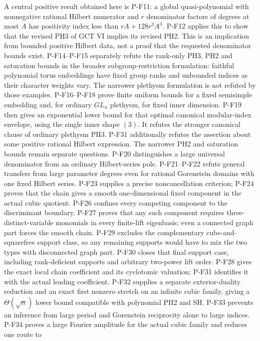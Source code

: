 \documentclass[11pt,a4paper]{article}
\begin{document}
A central positive result obtained here is P-F11: a global
quasi-polynomial with nonnegative rational Hilbert numerator and
$r$ denominator factors of degrees at most $A$ has positivity index
less than $rA+128r^3A^3$. P-F12 applies this to show that the revised
PH3 of GCT VI implies its revised PH2. This is an implication from
bounded positive Hilbert data, not a proof that the requested
denominator bounds exist.
P-F14--P-F15 separately refute the rank-only PH3, PH2 and saturation
bounds in the broader subgroup-restriction formulation: faithful
polynomial torus embeddings have fixed group ranks and unbounded
indices as their character weights vary. The narrower plethysm
formulation is not refuted by those examples.
P-F16--P-F18 prove finite uniform bounds for a fixed semisimple
embedding and, for ordinary $GL_n$ plethysm, for fixed inner dimension.
P-F19 then gives an exponential lower bound for that optimal canonical
modular-index envelope, using the single inner shape $(3)$.
It refutes the stronger canonical clause of ordinary plethysm PH3.
P-F31 additionally refutes the assertion about some positive rational
Hilbert expression. The narrower PH2 and saturation bounds remain
separate questions.
P-F20 distinguishes a large universal denominator from an ordinary
Hilbert-series pole. P-F21--P-F22 refute general transfers from large
parameter degrees even for rational Gorenstein domains with one fixed
Hilbert series. P-F23 supplies a precise noncancellation criterion;
P-F24 proves that the chain gives a smooth one-dimensional fixed
component in the actual cubic quotient. P-F26 confines every competing component
to the discriminant boundary. P-F27 proves that any such component
requires three-distinct-variable monomials in every finite-lift
eigenbasis; even a connected graph part forces the smooth chain.
P-F29 excludes the complementary cube-and-squarefree support class,
so any remaining supports would have to mix the two types with
disconnected graph part. P-F30 closes that final support case,
including rank-deficient supports and arbitrary two-power lift order.
P-F28 gives the exact local chain coefficient and its cyclotomic
valuation; P-F31 identifies it with the actual leading coefficient.
P-F32 supplies a separate exterior-duality reduction and an exact
first nonzero stretch on an infinite cubic family, giving a
$\Theta(\sqrt n)$ lower bound compatible with polynomial PH2 and SH.
P-F33 prevents an inference from large period and Gorenstein
reciprocity alone to large indices. P-F34 proves a large Fourier
amplitude for the actual cubic family and reduces one route to
\end{document}
